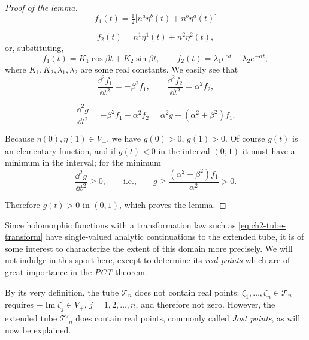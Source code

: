\begin{proof}[Proof of the lemma]
\begin{equation*}
  f_1(t)=\tfrac12\bigl[n^a\eta^b(t)+n^b\eta^a(t)\bigr]
\end{equation*}

\begin{equation*}
  f_2(t)=n^1\eta^1(t)+n^2\eta^2(t) ,
\end{equation*}
or, substituting,
\begin{equation*}
  f_1(t)=K_1\cos\beta t+K_2\sin\beta t,
  \qquad
  f_2(t)=\lambda_1e^{\alpha t}+\lambda_2e^{-\alpha t},
\end{equation*}
where $K_1,K_2,\lambda_1,\lambda_2$ are some real constants.  We easily see
that
\begin{equation*}
  \frac{\dd^2f_1}{\dd t^2}=-\beta^2f_1,
  \qquad
  \frac{\dd^2f_2}{\dd t^2}=\alpha^2f_2,
\end{equation*}

\begin{equation*}
  \frac{\dd^2g}{\dd t^2}
  =-\beta^2f_1-\alpha^2f_2
  =\alpha^2g-(\alpha^2+\beta^2)f_1 .
\end{equation*}

Because $\eta(0),\eta(1)\in V_{+}$, we have $g(0)>0$, $g(1)>0$.  Of
course $g(t)$ is an elementary function, and if $g(t)<0$ in the interval
$(0,1)$ it must have a minimum in the interval; for the minimum
\begin{equation*}
  \frac{\dd^2g}{\dd t^2}\geq0,
  \qquad\text{i.e.,}\qquad
  g\geq\frac{(\alpha^2+\beta^2)f_1}{\alpha^2}>0 .
\end{equation*}

Therefore $g(t)>0$ in $(0,1)$, which proves the lemma.
\end{proof}

Since holomorphic functions with a transformation law such as \eqref{eq:ch2-tube-transform} have
single-valued analytic continuations to the extended tube, it is of some
interest to characterize the extent of this domain more
precisely.  We will not indulge in this sport here, except to determine its
\emph{real points} which are of great importance in the \emph{PCT} theorem.

By its very definition, the tube $\mathcal{T}_{n}$ does not contain real
points: $\zeta_1,\ldots,\zeta_n\in\mathcal{T}_{n}$ requires
$-\operatorname{Im}\zeta_j\in V_{+}$, $j=1,2,\ldots,n$, and therefore not
zero.  However, the extended tube $\mathcal{T}'_{n}$ does contain real points,
commonly called \emph{Jost points}, as will now be explained.

